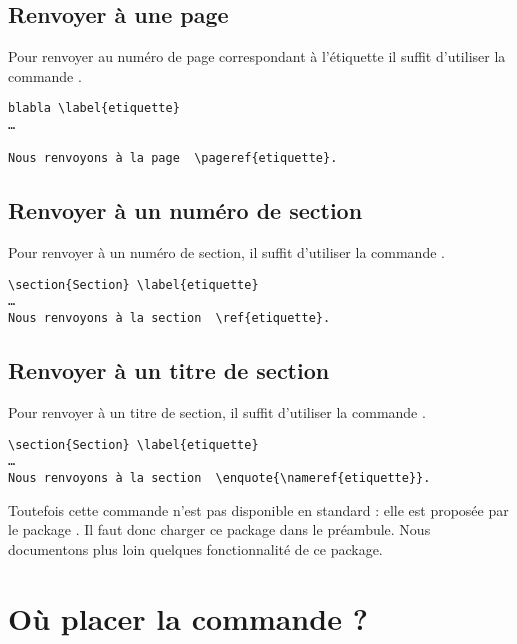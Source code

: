 \subsection{Renvoyer à une page}

Pour renvoyer au numéro de page correspondant à l'étiquette  il suffit d'utiliser la commande .

\begin{verbatim}
blabla \label{etiquette}
…

Nous renvoyons à la page  \pageref{etiquette}.
\end{verbatim}

\subsection{Renvoyer à un numéro de section}

Pour renvoyer à un numéro de section, il suffit d'utiliser la commande .

\begin{verbatim}
\section{Section} \label{etiquette}
…
Nous renvoyons à la section  \ref{etiquette}.
\end{verbatim}
 
\subsection{Renvoyer à un titre de section}\label{renvoititre}

Pour renvoyer à un titre de section, il suffit d'utiliser la commande .

\begin{verbatim}
\section{Section} \label{etiquette}
…
Nous renvoyons à la section  \enquote{\nameref{etiquette}}.
\end{verbatim}

Toutefois cette commande n'est pas disponible en standard : elle est proposée par le package . Il faut donc charger ce package dans le préambule. Nous documentons plus loin quelques fonctionnalité de ce package.


\section{Où placer la commande  ?}

